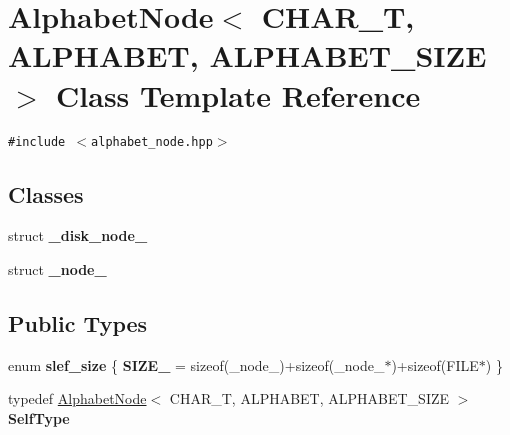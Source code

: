 \hypertarget{classAlphabetNode}{
\section{AlphabetNode$<$ CHAR\_\-T, ALPHABET, ALPHABET\_\-SIZE $>$ Class Template Reference}
\label{classAlphabetNode}
}
{\tt \#include $<$alphabet\_\-node.hpp$>$}

\subsection*{Classes}
\begin{CompactItemize}
\item 
struct \textbf{\_\-disk\_\-node\_\-}
\item 
struct \textbf{\_\-node\_\-}
\end{CompactItemize}
\subsection*{Public Types}
\begin{CompactItemize}
\item 
enum \textbf{slef\_\-size} \{ \textbf{SIZE\_\-} =  sizeof(\_\-node\_\-)+sizeof(\_\-node\_\-$\ast$)+sizeof(FILE$\ast$)
 \}
\item 
\hypertarget{classAlphabetNode_95b88d1de0beecbb0b24a72b7fc6400c}{
typedef \hyperlink{classAlphabetNode}{AlphabetNode}$<$ CHAR\_\-T, ALPHABET, ALPHABET\_\-SIZE $>$ \textbf{SelfType}}
\label{classAlphabetNode_95b88d1de0beecbb0b24a72b7fc6400c}

\end{CompactItemize}
